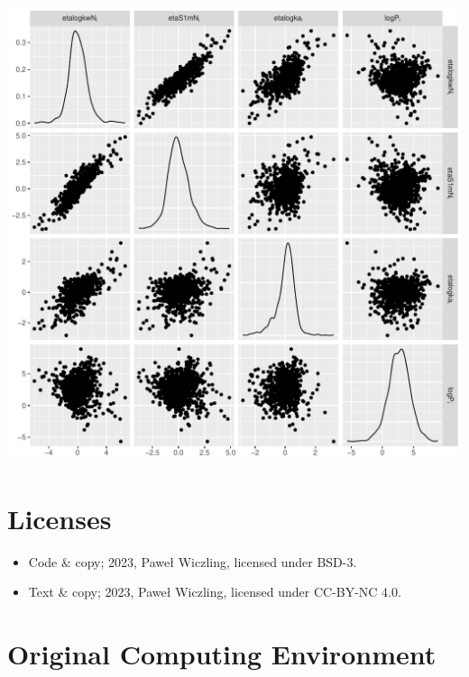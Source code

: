 \documentclass[
]{article}
\providecommand{\tightlist}{%
  \setlength{\itemsep}{0pt}\setlength{\parskip}{0pt}}\usepackage{longtable,booktabs,array}
\begin{document}
\includegraphics{../deliv/figures/manuscript/supplement/eta.pdf}

\newpage{}

\hypertarget{licenses}{%
\section*{Licenses}\label{licenses}}

\begin{itemize}
\tightlist
\item
  Code \& copy; 2023, Paweł Wiczling, licensed under BSD-3.
\item
  Text \& copy; 2023, Paweł Wiczling, licensed under CC-BY-NC 4.0.
\end{itemize}

\hypertarget{original-computing-environment}{%
\section*{Original Computing
Environment}\label{original-computing-environment}}
\end{document}
